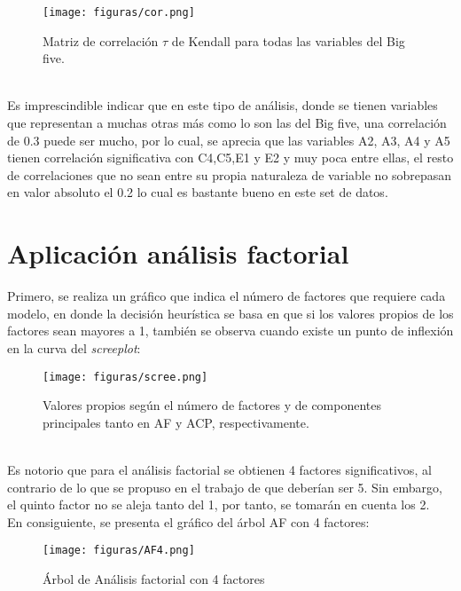 \documentclass{report}
\begin{document}
\begin{figure}[htp]
        \centering
    	\texttt{[image: figuras/cor.png]}
    	\caption{Matriz de correlación $\tau$ de Kendall para todas las variables del Big five.}
    	\label{fig: Figura1}
\end{figure}\\

Es imprescindible indicar que en este tipo de análisis, donde se tienen variables que representan a muchas otras más como lo son las del Big five, una correlación de 0.3 puede ser mucho, por lo cual, se aprecia que las variables A2, A3, A4 y A5 tienen correlación significativa con C4,C5,E1 y E2 y muy poca entre ellas, el resto de correlaciones que no sean entre su propia naturaleza de variable no sobrepasan en valor absoluto el 0.2 lo cual es bastante bueno en este set de datos.\\

\newpage
\section{Aplicación análisis factorial}
Primero, se realiza un gráfico que indica el número de factores que requiere cada modelo, en donde la decisión heurística se basa en que si los valores propios de los factores sean mayores a 1, también se observa cuando existe un punto de inflexión en la curva del \textit{screeplot}:\\
\begin{figure}[htp]
        \centering
    	\texttt{[image: figuras/scree.png]}
    	\caption{Valores propios según el número de factores y de componentes principales tanto en AF y ACP, respectivamente.}
    	\label{fig: Figura1}
\end{figure}\\

Es notorio que para el análisis factorial se obtienen 4 factores significativos, al contrario de lo que se propuso en el trabajo de que deberían ser 5. Sin embargo, el quinto factor no se aleja tanto del 1, por tanto, se tomarán en cuenta los 2.\\

En consiguiente, se presenta el gráfico del árbol AF con 4 factores:\\
\vspace{6cm}

\begin{figure}[htp]
        \centering
    	\texttt{[image: figuras/AF4.png]}
    	\caption{Árbol de Análisis factorial con 4 factores}
    	\label{fig: Figura1}
\end{figure}\\
\end{document}
